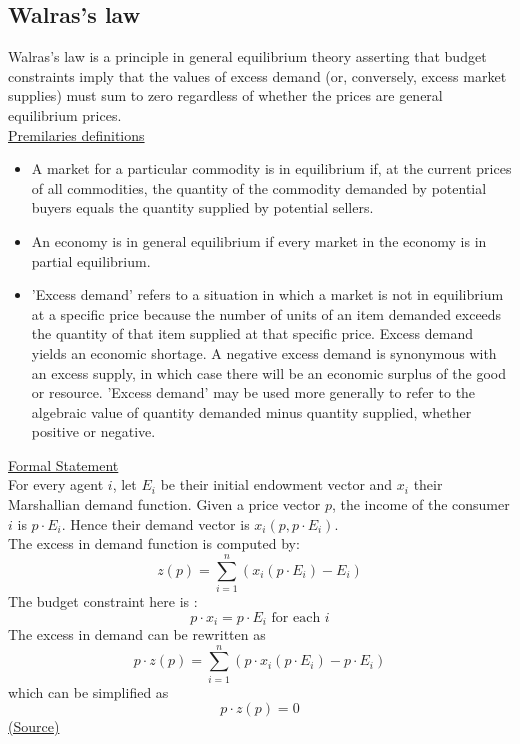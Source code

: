 \documentclass[a4paper, 12pt, reqno]{article}
\begin{document}
\subsection{Walras's law}
Walras's law is a principle in general equilibrium theory asserting that budget constraints imply that the values of excess demand (or, conversely, excess market supplies) 
must sum to zero regardless of whether the prices are general equilibrium prices. \\
\underline{Premilaries definitions}
\begin{itemize}
    \item A market for a particular commodity is in equilibrium if, at the current prices of all commodities, the quantity of the commodity demanded by potential buyers equals the quantity supplied by potential sellers.
    \item An economy is in general equilibrium if every market in the economy is in partial equilibrium.
    \item 'Excess demand' refers to a situation in which a market is not in equilibrium at a specific price because the number of units of an item demanded exceeds the quantity of that item supplied at that specific price. 
    Excess demand yields an economic shortage. A negative excess demand is synonymous with an excess supply, in which case there will be an economic surplus of the good or resource. 'Excess demand' may be used more generally to refer to the 
    algebraic value of quantity demanded minus quantity supplied, whether positive or negative.
\end{itemize}
\underline{Formal Statement} \\
For every agent $i$, let $E_i$ be their initial endowment vector and $x_i$ their Marshallian demand function. 
Given a price vector $p$, the income of the consumer $i$ is $p \cdot E_i$. Hence their demand vector is $x_i(p,p\cdot E_i)$.  \\
The excess in demand function is computed by: $$ z(p) = \sum_{i=1}^{n} (x_i(p \cdot E_i) - E_i) $$
The budget constraint here is : $$p \cdot x_i = p \cdot E_i \mbox{ for each } i$$
The excess in demand can be rewritten as $$ p \cdot z(p) = \sum_{i=1}^{n} (p \cdot x_i(p \cdot E_i) -  p \cdot E_i) $$
which can be simplified as $$p \cdot z(p) = 0$$
\href{https://en.wikipedia.org/wiki/Walras%27s_law}{(Source)}
\end{document}
